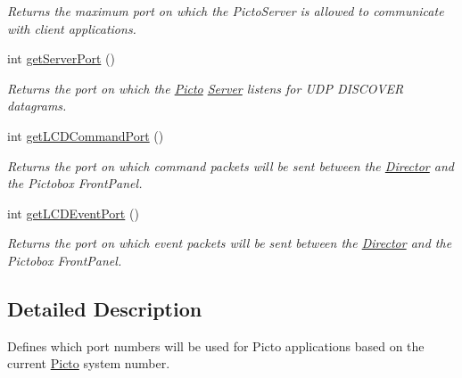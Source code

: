 \begin{DoxyCompactItemize}
\begin{DoxyCompactList}\small\item\em Returns the maximum port on which the Picto\-Server is allowed to communicate with client applications. \end{DoxyCompactList}\item 
\hypertarget{class_picto_1_1_port_nums_a9d0d94a8fc93b262a4f02623e0e2212d}{int \hyperlink{class_picto_1_1_port_nums_a9d0d94a8fc93b262a4f02623e0e2212d}{get\-Server\-Port} ()}\label{class_picto_1_1_port_nums_a9d0d94a8fc93b262a4f02623e0e2212d}

\begin{DoxyCompactList}\small\item\em Returns the port on which the \hyperlink{namespace_picto}{Picto} \hyperlink{class_server}{Server} listens for U\-D\-P D\-I\-S\-C\-O\-V\-E\-R datagrams. \end{DoxyCompactList}\item 
\hypertarget{class_picto_1_1_port_nums_a708b9dbf38f9368cf101fc65bea466d4}{int \hyperlink{class_picto_1_1_port_nums_a708b9dbf38f9368cf101fc65bea466d4}{get\-L\-C\-D\-Command\-Port} ()}\label{class_picto_1_1_port_nums_a708b9dbf38f9368cf101fc65bea466d4}

\begin{DoxyCompactList}\small\item\em Returns the port on which command packets will be sent between the \hyperlink{class_director}{Director} and the Pictobox Front\-Panel. \end{DoxyCompactList}\item 
\hypertarget{class_picto_1_1_port_nums_ae22fd5815fcfc65c9324ce1fcb3d2b03}{int \hyperlink{class_picto_1_1_port_nums_ae22fd5815fcfc65c9324ce1fcb3d2b03}{get\-L\-C\-D\-Event\-Port} ()}\label{class_picto_1_1_port_nums_ae22fd5815fcfc65c9324ce1fcb3d2b03}

\begin{DoxyCompactList}\small\item\em Returns the port on which event packets will be sent between the \hyperlink{class_director}{Director} and the Pictobox Front\-Panel. \end{DoxyCompactList}\end{DoxyCompactItemize}


\subsection{Detailed Description}
Defines which port numbers will be used for Picto applications based on the current \hyperlink{namespace_picto}{Picto} system number. 

